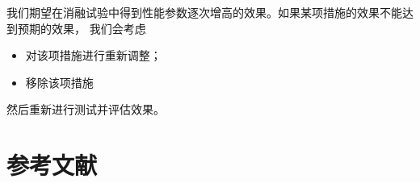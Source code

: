 \documentclass[a4paper,twoside,zihao=5,UTF8]{ctexrep}
\begin{document}
我们期望在消融试验中得到性能参数逐次增高的效果。如果某项措施的效果不能达到预期的效果，
我们会考虑
\begin{itemize}
    \item 对该项措施进行重新调整；
    \item 移除该项措施
\end{itemize}
然后重新进行测试并评估效果。

\part*{参考文献}



\end{document}

